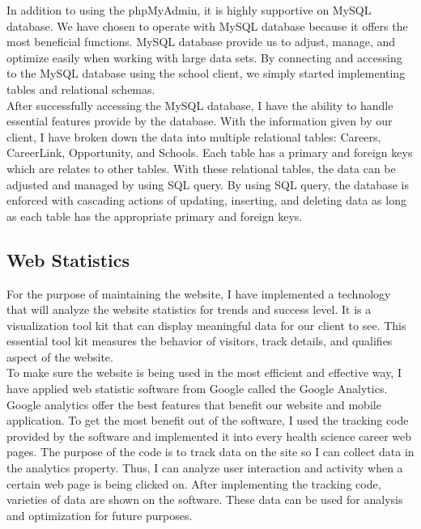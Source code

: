 \documentclass[onecolumn, draftclsnofoot,10pt, compsoc]{IEEEtran}
\begin{document}
\noindent In addition to using the phpMyAdmin, it is highly supportive on MySQL database. 
We have chosen to operate with MySQL database because it offers the most beneficial functions. 
MySQL database provide us to adjust, manage, and optimize easily when working with large data sets.
By connecting and accessing to the MySQL database using the school client, we simply started implementing tables and relational schemas.\\ 

\noindent After successfully accessing the MySQL database, I have the ability to handle essential features provide by the database. 
With the information given by our client, I have broken down the data into multiple relational tables: Careers, CareerLink, Opportunity, and Schools. 
Each table has a primary and foreign keys which are relates to other tables. With these relational tables, the data can be adjusted and managed by using SQL query. 
By using SQL query, the database is enforced with cascading actions of updating, inserting, and deleting data as long as each table has the appropriate primary and foreign keys. 

\subsection{Web Statistics}
\noindent For the purpose of maintaining the website, I have implemented a technology that will analyze the website statistics for trends and success level.
It is a visualization tool kit that can display meaningful data for our client to see. 
This essential tool kit measures the behavior of visitors, track details, and qualifies aspect of the website.\\ 

\noindent To make sure the website is being used in the most efficient and effective way, I have applied web statistic software from Google called the Google Analytics. 
Google analytics offer the best features that benefit our website and mobile application. 
To get the most benefit out of the software, I used the tracking code provided by the software and implemented it into every health science career web pages. 
The purpose of the code is to track data on the site so I can collect data in the analytics property. Thus, I can analyze user interaction and activity when a certain web page is being clicked on. 
After implementing the tracking code, varieties of data are shown on the software. 
These data can be used for analysis and optimization for future purposes.\\
\end{document}
